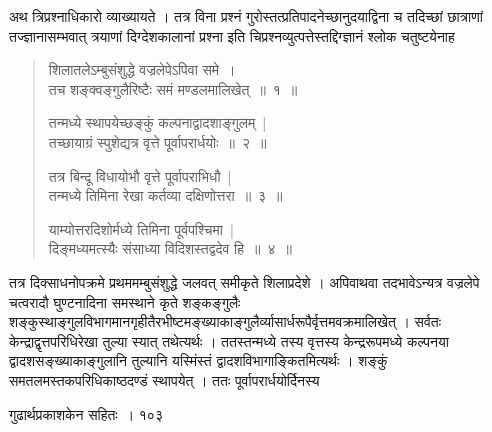 \documentclass[11pt, openany]{book}
\begin{document}
\begin{sloppypar}
\noindent अथ त्रिप्रश्नाधिकारो व्याख्यायते । तत्र विना प्रश्नं गुरोस्तत्प्रतिपादनेच्छानुदयाद्विना च तदिच्छां छात्राणां तज्ज्ञानासम्भवात् त्रयाणां दिग्देशकालानां प्रश्ना इति चिप्रश्नव्युत्पत्तेस्तद्दिग्ज्ञानं श्लोक चतुष्टयेनाह\textendash
\end{sloppypar}
\begin{quote}

  {\ssi शिलातलेऽम्बुसंशुद्धे वज्रलेपेऽपिवा समे~।\\
तच शङ्क्वङ्गुलैरिष्टैः समं मण्डलमालिखेत्~॥~१~॥

तन्मध्ये स्थापयेच्छङ्कुं कल्पनाद्वादशाङ्गुलम्~|\\
तच्छायाग्रं स्पुशेद्यत्र वृत्ते पूर्वापरार्धयोः~॥~२~॥

तत्र बिन्दू विधायोभौ वृत्ते पूर्वापराभिधौ~|\\
तन्मध्ये तिमिना रेखा कर्तव्या दक्षिणोत्तरा~॥~३~॥

याम्योत्तरदिशोर्मध्ये तिमिना पूर्वपश्चिमा~|\\
दिङ्मध्यमत्स्यैः संसाध्या विदिशस्तद्वदेव हि~॥~४~॥}
\end{quote}
\begin{sloppypar}
 तत्र दिक्साधनोपक्रमे प्रथममम्बुसंशुद्धे जलवत् समीकृते शिलाप्रदेशे । अपिवाथवा तदभावेऽन्यत्र वज्रलेपे चत्वरादौ घुण्टनादिना समस्थाने कृते शङ्कङ्गुलैः शङ्कुस्थाङ्गुलविभागमानगृहीतैरभीष्टमङ्ख्याकाङ्गुलैर्व्यासार्धरूपैर्वृत्तमवक्रमालिखेत् । सर्वतः केन्द्राद्वृत्तपरिधिरेखा तुल्या स्यात् तथेत्यर्थः । ततस्तन्मध्ये तस्य वृत्तस्य केन्द्ररूपमध्ये कल्पनया द्वादशसङ्ख्याकाङ्गुलानि तुल्यानि यस्मिंस्तं द्वादशविभागाङ्कितमित्यर्थः । शङ्कुं समतलमस्तकपरिधिकाष्ठदण्डं स्थापयेत् । ततः पूर्वापरार्धयोर्दिनस्य
\end{sloppypar}

\newpage


\hspace{3cm}  गुढार्थप्रकाशकेन सहितः~। \hfill १०३
\vspace{1cm}
\end{document}
